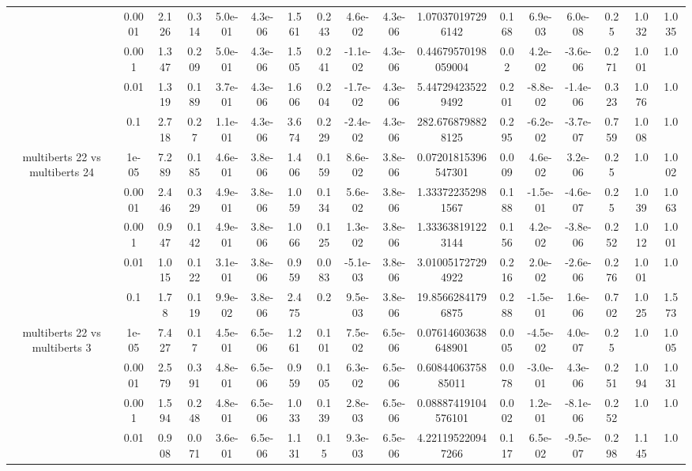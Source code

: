 \begin{tabular}{|c|c|c|c|c|c|c|c|c|c|c|c|c|c|c|c|c|}
 & 0.0001 & 2.126 & 0.314 & 5.0e-01 & 4.3e-06 & 1.561 & 0.243 & 4.6e-02 & 4.3e-06 & 1.070370197296142 & 0.168 & 6.9e-03 & 6.0e-08 & 0.25 & 1.032 & 1.035 \\
 & 0.001 & 1.347 & 0.209 & 5.0e-01 & 4.3e-06 & 1.505 & 0.241 & -1.1e-02 & 4.3e-06 & 0.44679570198059004 & 0.02 & 4.2e-02 & -3.6e-06 & 0.271 & 1.001 & 1.0 \\
 & 0.01 & 1.319 & 0.189 & 3.7e-01 & 4.3e-06 & 1.606 & 0.204 & -1.7e-02 & 4.3e-06 & 5.447294235229492 & 0.201 & -8.8e-02 & -1.4e-06 & 0.323 & 1.076 & 1.0 \\
 & 0.1 & 2.718 & 0.27 & 1.1e-01 & 4.3e-06 & 3.674 & 0.229 & -2.4e-02 & 4.3e-06 & 282.6768798828125 & 0.295 & -6.2e-02 & -3.7e-07 & 0.759 & 1.008 & 1.0 \\
\hline
\multirow{5}{*}{multiberts 22 vs multiberts 24} & 1e-05 & 7.289 & 0.185 & 4.6e-01 & 3.8e-06 & 1.406 & 0.159 & 8.6e-02 & 3.8e-06 & 0.07201815396547301 & 0.009 & 4.6e-02 & 3.2e-06 & 0.25 & 1.0 & 1.002 \\
 & 0.0001 & 2.446 & 0.329 & 4.9e-01 & 3.8e-06 & 1.059 & 0.134 & 5.6e-02 & 3.8e-06 & 1.333722352981567 & 0.188 & -1.5e-01 & -4.6e-07 & 0.25 & 1.039 & 1.063 \\
 & 0.001 & 0.947 & 0.142 & 4.9e-01 & 3.8e-06 & 1.066 & 0.125 & 1.3e-02 & 3.8e-06 & 1.333638191223144 & 0.156 & 4.2e-02 & -3.8e-06 & 0.252 & 1.012 & 1.001 \\
 & 0.01 & 1.015 & 0.122 & 3.1e-01 & 3.8e-06 & 0.959 & 0.083 & -5.1e-03 & 3.8e-06 & 3.010051727294922 & 0.216 & 2.0e-02 & -2.6e-06 & 0.276 & 1.001 & 1.0 \\
 & 0.1 & 1.78 & 0.119 & 9.9e-02 & 3.8e-06 & 2.475 & 0.2 & 9.5e-03 & 3.8e-06 & 19.85662841796875 & 0.288 & -1.5e-01 & 1.6e-06 & 0.702 & 1.025 & 1.573 \\
\hline
\multirow{5}{*}{multiberts 22 vs multiberts 3} & 1e-05 & 7.427 & 0.17 & 4.5e-01 & 6.5e-06 & 1.261 & 0.101 & 7.5e-02 & 6.5e-06 & 0.07614603638648901 & 0.005 & -4.5e-02 & 4.0e-07 & 0.25 & 1.0 & 1.005 \\
 & 0.0001 & 2.579 & 0.391 & 4.8e-01 & 6.5e-06 & 0.959 & 0.105 & 6.3e-02 & 6.5e-06 & 0.6084406375885011 & 0.078 & -3.0e-01 & 4.3e-06 & 0.251 & 1.094 & 1.031 \\
 & 0.001 & 1.594 & 0.248 & 4.8e-01 & 6.5e-06 & 1.033 & 0.139 & 2.8e-03 & 6.5e-06 & 0.08887419104576101 & 0.002 & 1.2e-01 & -8.1e-06 & 0.252 & 1.0 & 1.0 \\
 & 0.01 & 0.908 & 0.071 & 3.6e-01 & 6.5e-06 & 1.131 & 0.15 & 9.3e-03 & 6.5e-06 & 4.221195220947266 & 0.117 & 6.5e-02 & -9.5e-07 & 0.298 & 1.145 & 1.0 \\

\end{tabular}
